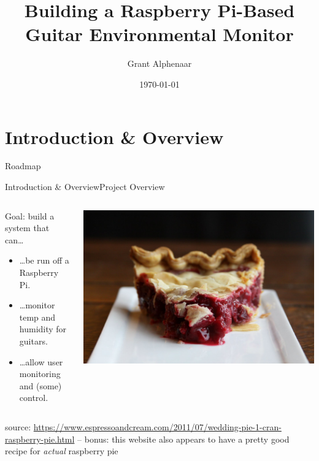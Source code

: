 \documentclass{beamer}
\title{Building a Raspberry Pi-Based\\Guitar Environmental Monitor}
\author{Grant Alphenaar}
\institute{CIS 641 -- GVSU}
\date{\today}
\begin{document}
  \newcommand{\sectitle}{}

  \begin{frame}
      \titlepage
  \end{frame}

  \renewcommand{\sectitle}{Introduction \& Overview}
  \section{\sectitle}

    \begin{frame}{Roadmap}
      \tableofcontents
    \end{frame}

    \begin{frame}{\sectitle}{Project Overview}
      \begin{columns}
        \begin{column}{.5\textwidth}
          Goal: build a system that can\dots
          \begin{itemize}
            \item \dots be run off a Raspberry Pi.
            \item \dots monitor temp and humidity for guitars.
            \item \dots allow user monitoring and (some) control.
          \end{itemize}
        \end{column}
        \begin{column}{.5\textwidth}
          \includegraphics[scale=.09]{images/raspberry-pie.jpg}
        \end{column}
      \end{columns}
      \vspace*{\fill}
      {\tiny{source: \url{https://www.espressoandcream.com/2011/07/wedding-pie-1-cran-raspberry-pie.html} -- bonus: this website also appears to have a pretty good recipe for \textit{actual} raspberry pie}}
    \end{frame}
\end{document}
